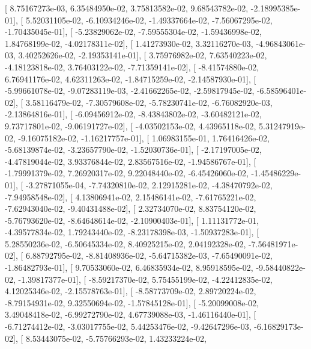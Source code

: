 \documentclass{article}
\begin{document}
       [  8.75167273e-03,   6.35484950e-02,   3.75813582e-02,
          9.68543782e-02,  -2.18995385e-01],
       [  5.52031105e-02,  -6.10934246e-02,  -1.49337664e-02,
         -7.56067295e-02,  -1.70435045e-01],
       [ -5.23829062e-02,  -7.59555304e-02,  -1.59436998e-02,
          1.84768199e-02,  -4.02178311e-02],
       [  1.41273930e-02,   3.32116270e-03,  -4.96843061e-03,
          3.40252626e-02,  -2.19353141e-01],
       [  3.75976982e-02,   7.63540223e-02,  -4.18123818e-02,
          3.76403122e-02,  -7.71359141e-02],
       [ -8.41574880e-02,   6.76941176e-02,   4.62311263e-02,
         -1.84715259e-02,  -2.14587930e-01],
       [ -5.99661078e-02,  -9.07283119e-03,  -2.41662265e-02,
         -2.59817945e-02,  -6.58596401e-02],
       [  3.58116479e-02,  -7.30579608e-02,  -5.78230741e-02,
         -6.76082920e-03,  -2.13864816e-01],
       [ -6.09456912e-02,  -8.43843802e-02,  -3.60482121e-02,
          9.73717801e-02,  -9.06191727e-02],
       [ -4.03502153e-02,   4.43965118e-02,   5.31247919e-02,
         -9.16075182e-02,  -1.16217757e-01],
       [  1.06983155e-01,   1.76416426e-02,  -5.68139874e-02,
         -3.23657790e-02,  -1.52030736e-01],
       [ -2.17197005e-02,  -4.47819044e-02,   3.93376844e-02,
          2.83567516e-02,  -1.94586767e-01],
       [ -1.79991379e-02,   7.26920317e-02,   9.22048440e-02,
         -6.45426060e-02,  -1.45486229e-01],
       [ -3.27871055e-04,  -7.74320810e-02,   2.12915281e-02,
         -4.38470792e-02,  -7.94958548e-02],
       [  4.13806941e-02,   2.15486141e-02,  -7.61765221e-02,
         -7.62943040e-02,  -9.40431488e-02],
       [  2.32734070e-02,   8.83754120e-02,  -5.76793620e-02,
         -8.64648614e-02,  -2.10900403e-01],
       [  1.11131772e-01,  -4.39577834e-02,   1.79243440e-02,
         -8.23178398e-03,  -1.50937283e-01],
       [  5.28550236e-02,  -6.50645334e-02,   8.40925215e-02,
          2.04192328e-02,  -7.56481971e-02],
       [  6.88792795e-02,  -8.81408936e-02,  -5.64715382e-03,
         -7.65490091e-02,  -1.86482793e-01],
       [  9.70533060e-02,   6.46835934e-02,   8.95918595e-02,
         -9.58440822e-02,  -1.39817377e-01],
       [ -8.59217370e-02,   5.75455199e-02,  -4.22412835e-02,
          4.12025346e-02,  -2.15578763e-01],
       [ -8.58773709e-02,   2.89720224e-02,  -8.79154931e-02,
          9.32550694e-02,  -1.57845128e-01],
       [ -5.20099008e-02,   3.49048418e-02,  -6.99272790e-02,
          4.67739088e-03,  -1.46116440e-01],
       [ -6.71274412e-02,  -3.03017755e-02,   5.44253476e-02,
         -9.42647296e-03,  -6.16829173e-02],
       [  8.53443075e-02,  -5.75766293e-02,   1.43233224e-02,
\end{document}
